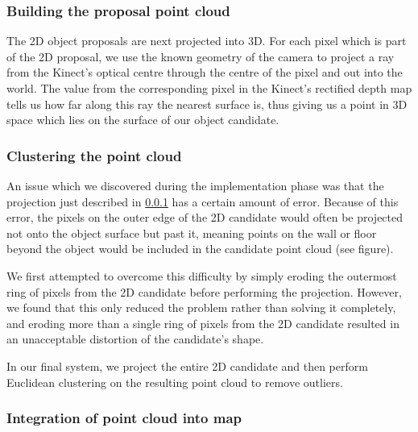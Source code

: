 
\subsubsection{Building the proposal point cloud}
\label{sssec:building_proposal_point_cloud}

The 2D object proposals are next projected into 3D.
For each pixel which is part of the 2D proposal, we use the known geometry of the camera to project a ray from the Kinect's optical centre through the centre of the pixel and out into the world.
The value from the corresponding pixel in the Kinect's rectified depth map tells us how far along this ray the nearest surface is, thus giving us a point in 3D space which lies on the surface of our object candidate.

\subsubsection{Clustering the point cloud}

An issue which we discovered during the implementation phase was that the projection just described in \ref{sssec:building_proposal_point_cloud} has a certain amount of error.
Because of this error, the pixels on the outer edge of the 2D candidate would often be projected not onto the object surface but past it, meaning points on the wall or floor beyond the object would be included in the candidate point cloud (see figure). 

We first attempted to overcome this difficulty by simply eroding the outermost ring of pixels from the 2D candidate before performing the projection.
However, we found that this only reduced the problem rather than solving it completely, and eroding more than a single ring of pixels from the 2D candidate resulted in an unacceptable distortion of the candidate's shape.

In our final system, we project the entire 2D candidate and then perform Euclidean clustering on the resulting point cloud to remove outliers.

\subsubsection{Integration of point cloud into map}

